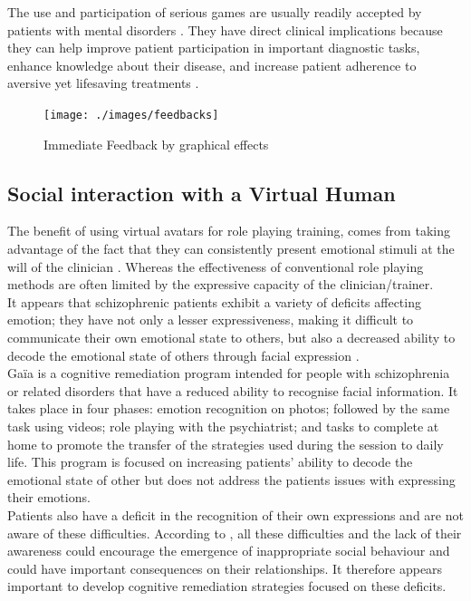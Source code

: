 \documentclass[11pt]{article}
\begin{document}
The use and participation of serious games are usually readily accepted by patients with mental disorders \citep{Fernandez12}. They have direct clinical implications because they can help improve patient participation in important diagnostic tasks, enhance knowledge about their disease, and increase patient adherence to aversive yet lifesaving treatments \citep{Kato12}.\\
\begin{figure}[!h]
   	\centerline{\texttt{[image: ./images/feedbacks]}}
   	\caption{\label{Figure Feedback} Immediate Feedback by graphical effects \citep{Thompson10}}
\end{figure}

\subsection{Social interaction with a Virtual Human}
The benefit of using virtual avatars for role playing training, comes from taking advantage of the fact that they can consistently present emotional stimuli at the will of the clinician \citep{Kim11}. Whereas the effectiveness of conventional role playing methods are often limited by the expressive capacity of the clinician/trainer. \\

It appears that schizophrenic patients exhibit a variety of deficits affecting emotion; they have not only a lesser expressiveness, making it difficult to communicate their own emotional state to others, but also a decreased ability to decode the emotional state of others through facial expression \citep{Peyroux14}.\\

Ga\"{i}a \citep{Gaudelus12} is a cognitive remediation program intended for people with schizophrenia or related disorders that have a reduced ability to recognise facial information. It takes place in four phases: emotion recognition on photos; followed by the same task using videos; role playing with the psychiatrist; and tasks to complete at home to promote the transfer of the strategies used during the session to daily life. This program is focused on increasing patients' ability to decode the emotional state of other but does not address the patients issues with expressing their emotions.\\

Patients also have a deficit in the recognition of their own expressions and are not aware of these difficulties. According to \citeauthor{Weiss09}, all these difficulties and the lack of their awareness could encourage the emergence of inappropriate social behaviour and could have important consequences on their relationships. It therefore appears important to develop cognitive remediation strategies focused on these deficits.\\
\end{document}
